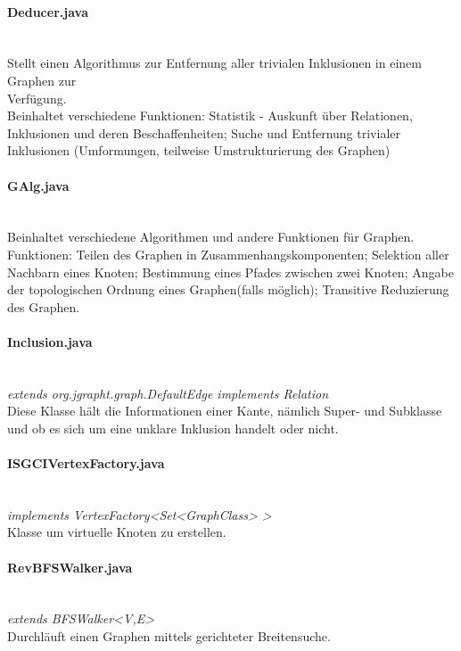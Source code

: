 \documentclass[10pt,a4paper]{article}
\begin{document}
\paragraph{Deducer.java}\ \\
Stellt einen Algorithmus zur Entfernung aller trivialen Inklusionen in einem Graphen zur \\Verfügung.\\
Beinhaltet verschiedene Funktionen: Statistik - Auskunft über Relationen, Inklusionen und deren Beschaffenheiten; Suche und Entfernung trivialer Inklusionen (Umformungen, teilweise Umstrukturierung des Graphen)\\

\paragraph{GAlg.java}\ \\
Beinhaltet verschiedene Algorithmen und andere Funktionen für Graphen.\\
Funktionen: Teilen des Graphen in Zusammenhangskomponenten; Selektion aller Nachbarn eines Knoten; Bestimmung eines Pfades zwischen zwei Knoten; Angabe der topologischen Ordnung eines Graphen(falls möglich); Transitive Reduzierung des Graphen.\\

\paragraph{Inclusion.java}\ \\
\emph{extends org.jgrapht.graph.DefaultEdge
        implements Relation}\\
Diese Klasse hält die Informationen einer Kante, nämlich Super- und Subklasse und ob es sich um eine unklare Inklusion handelt oder nicht.\\
\paragraph{ISGCIVertexFactory.java}\ \\
\emph{ implements VertexFactory<Set<GraphClass> >}\\
Klasse um virtuelle Knoten zu erstellen.\\
\paragraph{RevBFSWalker.java}\ \\
\emph{extends BFSWalker<V,E>}\\
Durchläuft einen Graphen mittels gerichteter Breitensuche.\
\end{document}

